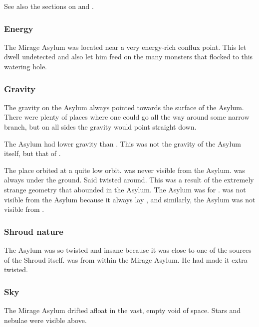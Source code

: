 See also the sections on  and . 





\subsubsection{Energy}
The Mirage Asylum was located near a very energy-rich conflux point.
This let \Iscrafel dwell undetected and also let him feed on the many monsters that flocked to this watering hole. 





\subsubsection{Gravity}
The gravity on the Asylum always pointed  towards the surface of the Asylum. 
There were plenty of places where one could go all the way around some narrow branch, but on all sides the gravity would point straight down. 

The Asylum had lower gravity than \Miith. 
This was not the gravity of the Asylum itself, but that of \Miith. 

The place orbited \Miith at a quite low orbit. 
\Miith was never visible from the Asylum. 
\Miith was always  under the ground. 
Said  twisted around.
This was a result of the extremely strange geometry that abounded in the Asylum. 
The Asylum was  for \Ishnaruchaefir. 
\Miith was not visible from the Asylum because it always lay , and similarly, the Asylum was not visible from \Miith. 





\subsubsection{Shroud nature}
The Asylum was so twisted and insane because it was close to one of the sources of the Shroud itself. 
\Ishnaruchaefir was  from within the Mirage Asylum. 
He had made it extra twisted. 





\subsubsection{Sky}
The Mirage Asylum drifted afloat in the vast, empty void of space. 
Stars and nebulae were visible above. 

